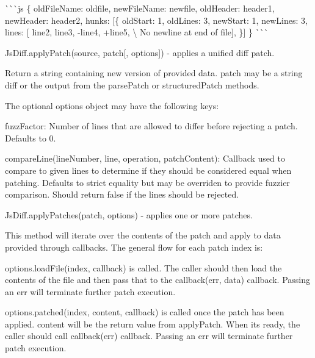 \begin{DoxyItemize}
\`{}\`{}\`{}js \{ old\+File\+Name\+: \textquotesingle{}oldfile\textquotesingle{}, new\+File\+Name\+: \textquotesingle{}newfile\textquotesingle{}, old\+Header\+: \textquotesingle{}header1\textquotesingle{}, new\+Header\+: \textquotesingle{}header2\textquotesingle{}, hunks\+: \mbox{[}\{ old\+Start\+: 1, old\+Lines\+: 3, new\+Start\+: 1, new\+Lines\+: 3, lines\+: \mbox{[}\textquotesingle{} line2\textquotesingle{}, \textquotesingle{} line3\textquotesingle{}, \textquotesingle{}-\/line4\textquotesingle{}, \textquotesingle{}+line5\textquotesingle{}, \textquotesingle{}\textbackslash{} No newline at end of file\textquotesingle{}\mbox{]}, \}\mbox{]} \} \`{}\`{}\`{}
\item {\ttfamily Js\+Diff.\+apply\+Patch(source, patch\mbox{[}, options\mbox{]})} -\/ applies a unified diff patch.

Return a string containing new version of provided data. {\ttfamily patch} may be a string diff or the output from the {\ttfamily parse\+Patch} or {\ttfamily structured\+Patch} methods.

The optional {\ttfamily options} object may have the following keys\+:
\begin{DoxyItemize}
\item {\ttfamily fuzz\+Factor}\+: Number of lines that are allowed to differ before rejecting a patch. Defaults to 0.
\item {\ttfamily compare\+Line(line\+Number, line, operation, patch\+Content)}\+: Callback used to compare to given lines to determine if they should be considered equal when patching. Defaults to strict equality but may be overriden to provide fuzzier comparison. Should return false if the lines should be rejected.
\end{DoxyItemize}
\item {\ttfamily Js\+Diff.\+apply\+Patches(patch, options)} -\/ applies one or more patches.

This method will iterate over the contents of the patch and apply to data provided through callbacks. The general flow for each patch index is\+:
\begin{DoxyItemize}
\item {\ttfamily options.\+load\+File(index, callback)} is called. The caller should then load the contents of the file and then pass that to the {\ttfamily callback(err, data)} callback. Passing an {\ttfamily err} will terminate further patch execution.
\item {\ttfamily options.\+patched(index, content, callback)} is called once the patch has been applied. {\ttfamily content} will be the return value from {\ttfamily apply\+Patch}. When it\textquotesingle{}s ready, the caller should call {\ttfamily callback(err)} callback. Passing an {\ttfamily err} will terminate further patch execution.
\end{DoxyItemize}


\end{DoxyItemize}
